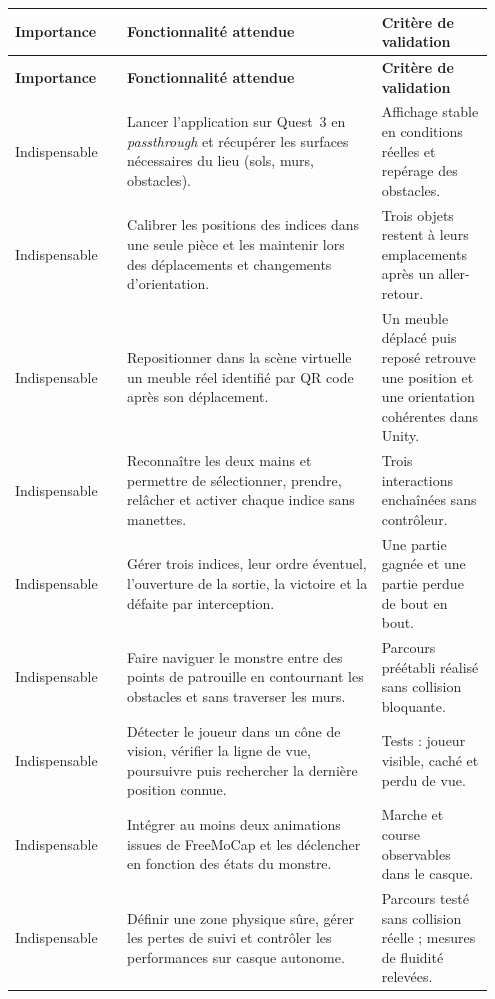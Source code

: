 \documentclass[11pt,a4paper]{article}
\newcommand{\essential}{\textcolor{priorityHigh}{Indispensable}}
\renewcommand{\arraystretch}{1.36}
\begin{document}
{\small
\setlength{\LTpre}{1.1em}
\setlength{\LTpost}{0.9em}
\renewcommand{\arraystretch}{1.42}
\begin{longtable}{@{}L{0.222\linewidth}L{0.50\linewidth}L{0.224\linewidth}@{}}
\toprule
\textbf{Importance} & \textbf{Fonctionnalité attendue} & \textbf{Critère de validation} \\
\midrule
\endfirsthead
\toprule
\textbf{Importance} & \textbf{Fonctionnalité attendue} & \textbf{Critère de validation} \\
\midrule
\endhead
\essential & Lancer l'application sur Quest~3 en \emph{passthrough} et récupérer les surfaces nécessaires du lieu (sols, murs, obstacles). & Affichage stable en conditions réelles et repérage des obstacles. \\
\addlinespace[0.25em]
\essential & Calibrer les positions des indices dans une seule pièce et les maintenir lors des déplacements et changements d'orientation. & Trois objets restent à leurs emplacements après un aller-retour. \\
\addlinespace[0.25em]
\essential & Repositionner dans la scène virtuelle un meuble réel identifié par QR code après son déplacement. & Un meuble déplacé puis reposé retrouve une position et une orientation cohérentes dans Unity. \\
\addlinespace[0.25em]
\essential & Reconnaître les deux mains et permettre de sélectionner, prendre, relâcher et activer chaque indice sans manettes. & Trois interactions enchaînées sans contrôleur. \\
\addlinespace[0.25em]
\essential & Gérer trois indices, leur ordre éventuel, l'ouverture de la sortie, la victoire et la défaite par interception. & Une partie gagnée et une partie perdue de bout en bout. \\
\addlinespace[0.25em]
\essential & Faire naviguer le monstre entre des points de patrouille en contournant les obstacles et sans traverser les murs. & Parcours préétabli réalisé sans collision bloquante. \\
\addlinespace[0.25em]
\essential & Détecter le joueur dans un cône de vision, vérifier la ligne de vue, poursuivre puis rechercher la dernière position connue. & Tests : joueur visible, caché et perdu de vue. \\
\addlinespace[0.25em]
\essential & Intégrer au moins deux animations issues de FreeMoCap et les déclencher en fonction des états du monstre. & Marche et course observables dans le casque. \\
\addlinespace[0.25em]
\essential & Définir une zone physique sûre, gérer les pertes de suivi et contrôler les performances sur casque autonome. & Parcours testé sans collision réelle ; mesures de fluidité relevées. \\
\bottomrule
\end{longtable}
}
\end{document}
